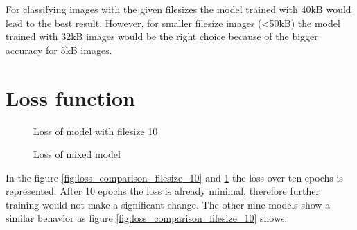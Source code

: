 \noindent
For classifying images with the given filesizes the model trained with 40kB would lead to the best result. However, for smaller filesize images (\textless 50kB) the model trained with 32kB images would be the right choice because of the bigger accuracy for 5kB images.

\section{Loss function}

\begin{figure}[h!]
    \centering
    \begin{minipage}{0.7\textwidth}
        \centering
        \resizebox{\textwidth}{!}{}
        \caption{Loss of model with filesize 10}
        \label{fig:loss_comparison_filesize_10}
    \end{minipage}\hfill
    \begin{minipage}{0.7\textwidth}
        \centering
        \resizebox{\textwidth}{!}{}
        \caption{Loss of mixed model}
        \label{fig:loss_comparison_filesize_mixed}
    \end{minipage}
\end{figure}

\noindent
In the figure \ref{fig:loss_comparison_filesize_10} and \ref{fig:loss_comparison_filesize_mixed} the loss over ten epochs is represented. After 10 epochs the loss is already minimal, therefore further training would not make a significant change. The other nine models show a similar behavior as figure \ref{fig:loss_comparison_filesize_10} shows.


\printbibliography

